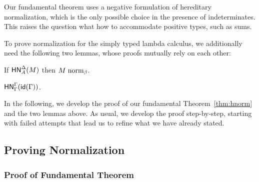 \documentclass{article}
\begin{document}
Our fundamental theorem uses a negative formulation of hereditary normalization, which is the
only possible choice in the presence of indeterminates.  This raises the question what how to
accommodate positive types, such as sums.

To prove normalization for the simply typed lambda calculus, we additionally need the following
two lemmas, whose proofs mutually rely on each other:

\begin{lemma}\label{l2}
If $\mathsf{HN}^{\Delta}_{A}(M)$ then $M \mathrel{\text{norm}_\beta}$.
\end{lemma}

\begin{lemma}\label{l3}
$\mathsf{HN}^{\Gamma}_{\Gamma}(\mathsf{id}(\Gamma))$.
\end{lemma}

In the following, we develop the proof of our fundamental Theorem~\ref{thm:hnorm} and the two
lemmas above.  As usual, we develop the proof step-by-step, starting with failed attempts that
lead us to refine what we have already stated.

\subsection{Proving Normalization}

\subsubsection{Proof of Fundamental Theorem}
\end{document}
